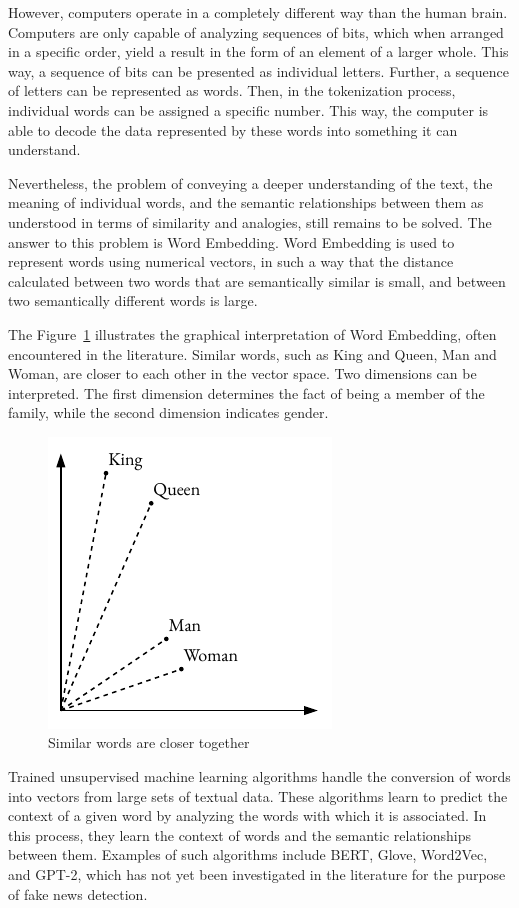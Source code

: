However, computers operate in a completely different way than the human brain. Computers are only capable of analyzing sequences of bits, which when arranged in a specific order, yield a result in the form of an element of a larger whole. This way, a sequence of bits can be presented as individual letters. Further, a sequence of letters can be represented as words. Then, in the tokenization process, individual words can be assigned a specific number. This way, the computer is able to decode the data represented by these words into something it can understand.

Nevertheless, the problem of conveying a deeper understanding of the text, the meaning of individual words, and the semantic relationships between them as understood in terms of similarity and analogies, still remains to be solved. The answer to this problem is Word Embedding. Word Embedding is used to represent words using numerical vectors, in such a way that the distance calculated between two words that are semantically similar is small, and between two semantically different words is large.

The Figure~\ref{embedding_example} illustrates the graphical interpretation of Word Embedding, often encountered in the literature. Similar words, such as King and Queen, Man and Woman, are closer to each other in the vector space. Two dimensions can be interpreted. The first dimension determines the fact of being a member of the family, while the second dimension indicates gender.

\begin{figure}[hbt!]
\centering
\includegraphics[width=0.55\linewidth]{embedding_example.pdf}
\caption{Similar words are closer together}
\label{embedding_example}
\end{figure}

Trained unsupervised machine learning algorithms handle the conversion of words into vectors from large sets of textual data. These algorithms learn to predict the context of a given word by analyzing the words with which it is associated. In this process, they learn the context of words and the semantic relationships between them. Examples of such algorithms include BERT, Glove, Word2Vec, and GPT-2, which has not yet been investigated in the literature for the purpose of fake news detection.

